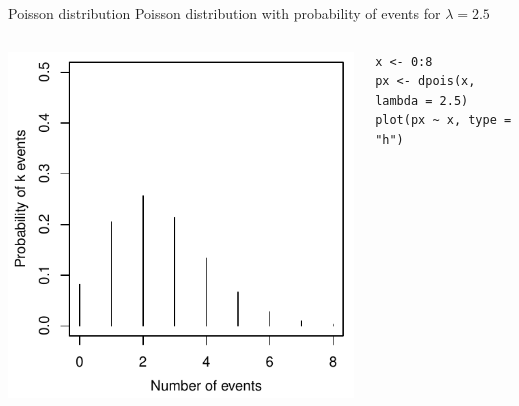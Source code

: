 \documentclass[aspectratio=169]{beamer}
\begin{document}
\begin{frame}[fragile]{Poisson distribution}
  Poisson distribution with probability of events for $\lambda = 2.5$\\[2ex]

\begin{columns}[c]
\begin{column}{.6\textwidth}
  \begin{center}
    \includegraphics[scale=.7]{../figures/pois_dist}
  \end{center}
\end{column}
\begin{column}{.4\textwidth}
  \begin{lstlisting}
x <- 0:8
px <- dpois(x, lambda = 2.5)
plot(px ~ x, type = "h")
\end{lstlisting}
\end{column}
\end{columns}
\end{frame}
\end{document}
